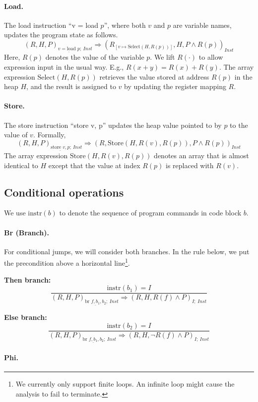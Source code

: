 \paragraph{Load.}
The load instruction ``v = load $p$'', where both $v$ and $p$ are variable names, updates the program state as follows.
\[
{(R, H, P)_{\underline{v = \text{load } p};\ \mathit{Inst}} \Rightarrow (R_{[v \mapsto \text{Select}(H, R(p))]}, H, P \wedge R(p))_\mathit{Inst}}
\]
Here, $R(p)$ denotes the value of the variable $p$. We lift $R(\cdot)$ to allow expression input in the usual way. E.g., $R(x+y) = R(x) + R(y)$.
The array expression $\text{Select}(H, R(p))$ retrieves the value stored at address $R(p)$ in the heap $H$, and the result is assigned to $v$ by updating the register mapping $R$.

\paragraph{Store.}
The store instruction ``store v, p'' updates the heap value pointed to by $p$ to the value of $v$. Formally,
\[(R,H, P)_{\underline{\text{store } v, p};\ \mathit{Inst}}   \Rightarrow (R, \text{Store}(H, R(v), R(p)), P \wedge R(p))_\mathit{Inst}\]
The array expression $\text{Store}(H, R(v), R(p))$ denotes an array that is almost identical to $H$ except that the value at index $R(p)$ is replaced with $R(v)$.
\subsection{Conditional operations}
We use $\text{instr}(b)$ to denote the sequence of program commands in code block $b$.
\paragraph{Br (Branch).}
For conditional jumps, we will consider both branches. In the rule below, we put the precondition above a horizontal line\footnote{We currently only support finite loops. An infinite loop might cause the analysis to fail to terminate.}. 

\textbf{Then branch:}
\[\frac{\text{instr}(b_1)=I}
{(R,H, P)_{\underline{\text{br } f,b_1,b_2};\ \mathit{Inst}} \Rightarrow (R, H, R(f) \wedge P)_{I;\ \mathit{Inst}}}
\]

\textbf{Else branch:}
\[\frac{\text{instr}(b_2)=I}
{(R,H,P)_{\underline{\text{br } f,b_1,b_2};\ \mathit{Inst}} \Rightarrow (R, H, \neg R(f) \wedge P )_{I;\ \mathit{Inst}}}\]

\paragraph{Phi.}

